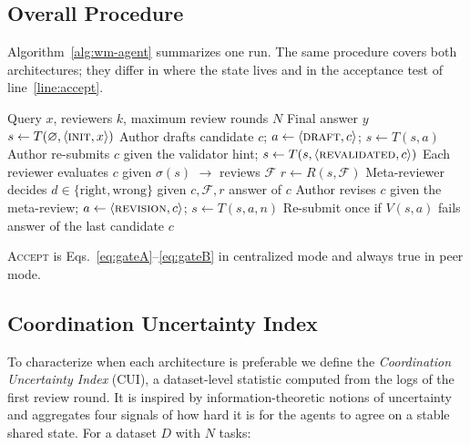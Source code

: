 \subsection{Overall Procedure}

Algorithm~\ref{alg:wm-agent} summarizes one run. The same procedure covers both architectures; they differ in where the state lives and in the acceptance test of line~\ref{line:accept}.

\begin{algorithm}[t]
\caption{World-Model--Guided Multi-Agent Reasoning}
\label{alg:wm-agent}
\begin{algorithmic}[1]
\REQUIRE Query \(x\), reviewers \(k\), maximum review rounds \(N\)
\ENSURE Final answer \(y\)
\STATE \(s \leftarrow T(\varnothing, \langle\textsc{init}, x\rangle)\)
\STATE Author drafts candidate \(c\); \(a \leftarrow \langle\textsc{draft}, c\rangle\); \(s \leftarrow T(s, a)\)
    \STATE Author re-submits \(c\) given the validator hint; \(s \leftarrow T(s, \langle\textsc{revalidated}, c\rangle)\)
\ENDIF
{}
    \STATE Each reviewer evaluates \(c\) given \(\sigma(s)\) \(\rightarrow\) reviews \(\mathcal{F}\)
    \STATE \(r \leftarrow R(s, \mathcal{F})\) 
    \STATE Meta-reviewer decides \(d\in\{\text{right},\text{wrong}\}\) given \(c, \mathcal{F}, r\)
     \label{line:accept}
        \RETURN answer of \(c\)
    \ENDIF
        \STATE Author revises \(c\) given the meta-review; \(a \leftarrow \langle\textsc{revision}, c\rangle\); \(s \leftarrow T(s,a,n)\)
        \STATE Re-submit once if \(V(s,a)\) fails
    \ENDIF
\ENDFOR
\RETURN answer of the last candidate \(c\)
\end{algorithmic}
\vspace{2pt}
{\footnotesize \textsc{Accept} is Eqs.~\eqref{eq:gateA}--\eqref{eq:gateB} in centralized mode and always true in peer mode.}
\end{algorithm}

\subsection{Coordination Uncertainty Index}
\label{sec:cui}

To characterize when each architecture is preferable we define the \emph{Coordination Uncertainty Index} (CUI), a dataset-level statistic computed from the logs of the first review round.
It is inspired by information-theoretic notions of uncertainty~\cite{shannon1948mathematical} and aggregates four signals of how hard it is for the agents to agree on a stable shared state.
For a dataset \(D\) with \(N\) tasks:

